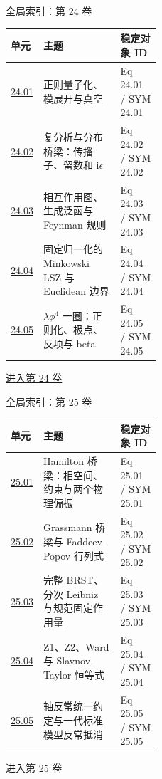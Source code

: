 \documentclass[aspectratio=169,10pt]{ctexbeamer}
\begin{document}
\begin{frame}[t]{全局索引：第 24 卷}
\small\begin{tabularx}{\linewidth}{p{0.15\linewidth}Yp{0.27\linewidth}}
\toprule 单元 & 主题 & 稳定对象 ID\\\midrule
\hyperlink{Fr:24.01-1}{24.01} & 正则量子化、模展开与真空 & Eq 24.01 / SYM 24.01\\
\hyperlink{Fr:24.02-1}{24.02} & 复分析与分布桥梁：传播子、留数和 i\ensuremath{\epsilon} & Eq 24.02 / SYM 24.02\\
\hyperlink{Fr:24.03-1}{24.03} & 相互作用图、生成泛函与 Feynman 规则 & Eq 24.03 / SYM 24.03\\
\hyperlink{Fr:24.04-1}{24.04} & 固定归一化的 Minkowski LSZ 与 Euclidean 边界 & Eq 24.04 / SYM 24.04\\
\hyperlink{Fr:24.05-1}{24.05} & \ensuremath{\lambda}\ensuremath{\phi}\ensuremath{^{4}} 一圈：正则化、极点、反项与 beta & Eq 24.05 / SYM 24.05\\
\bottomrule\end{tabularx}
\vfill\hyperlink{Fr:V24-title}{进入第 24 卷}
\end{frame}

\begin{frame}[t]{全局索引：第 25 卷}
\small\begin{tabularx}{\linewidth}{p{0.15\linewidth}Yp{0.27\linewidth}}
\toprule 单元 & 主题 & 稳定对象 ID\\\midrule
\hyperlink{Fr:25.01-1}{25.01} & Hamilton 桥梁：相空间、约束与两个物理偏振 & Eq 25.01 / SYM 25.01\\
\hyperlink{Fr:25.02-1}{25.02} & Grassmann 桥梁与 Faddeev--Popov 行列式 & Eq 25.02 / SYM 25.02\\
\hyperlink{Fr:25.03-1}{25.03} & 完整 BRST、分次 Leibniz 与规范固定作用量 & Eq 25.03 / SYM 25.03\\
\hyperlink{Fr:25.04-1}{25.04} & Z1、Z2、Ward 与 Slavnov--Taylor 恒等式 & Eq 25.04 / SYM 25.04\\
\hyperlink{Fr:25.05-1}{25.05} & 轴反常统一约定与一代标准模型反常抵消 & Eq 25.05 / SYM 25.05\\
\bottomrule\end{tabularx}
\vfill\hyperlink{Fr:V25-title}{进入第 25 卷}
\end{frame}
\end{document}
